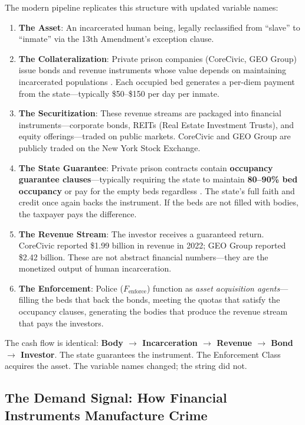 \documentclass[12pt,openany]{book}
\begin{document}
The modern pipeline replicates this structure with updated variable names:

\begin{enumerate}
    \item \textbf{The Asset}: An incarcerated human being, legally reclassified from ``slave'' to ``inmate'' via the 13th Amendment's exception clause.
    \item \textbf{The Collateralization}: Private prison companies (CoreCivic, GEO Group) issue bonds and revenue instruments whose value depends on maintaining incarcerated populations \cite{alexander}. Each occupied bed generates a per-diem payment from the state---typically \$50--\$150 per day per inmate.
    \item \textbf{The Securitization}: These revenue streams are packaged into financial instruments---corporate bonds, REITs (Real Estate Investment Trusts), and equity offerings---traded on public markets. CoreCivic and GEO Group are publicly traded on the New York Stock Exchange.
    \item \textbf{The State Guarantee}: Private prison contracts contain \textbf{occupancy guarantee clauses}---typically requiring the state to maintain \textbf{80--90\% bed occupancy} or pay for the empty beds regardless \cite{itpi}. The state's full faith and credit once again backs the instrument. If the beds are not filled with bodies, the taxpayer pays the difference.
    \item \textbf{The Revenue Stream}: The investor receives a guaranteed return. CoreCivic reported \$1.99 billion in revenue in 2022; GEO Group reported \$2.42 billion. These are not abstract financial numbers---they are the monetized output of human incarceration.
    \item \textbf{The Enforcement}: Police ($F_{\text{enforce}}$) function as \textit{asset acquisition agents}---filling the beds that back the bonds, meeting the quotas that satisfy the occupancy clauses, generating the bodies that produce the revenue stream that pays the investors.
\end{enumerate}

The cash flow is identical: \textbf{Body $\rightarrow$ Incarceration $\rightarrow$ Revenue $\rightarrow$ Bond $\rightarrow$ Investor}. The state guarantees the instrument. The Enforcement Class acquires the asset. The variable names changed; the string did not.

\subsection{The Demand Signal: How Financial Instruments Manufacture Crime}
\end{document}
